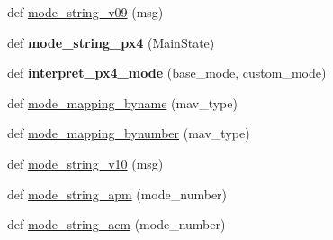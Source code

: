 \begin{DoxyCompactItemize}
\item 
def \hyperlink{namespacepymavlink_1_1mavutil_a783db06982d9f522333a924ab479771b}{mode\+\_\+string\+\_\+v09} (msg)
\item 
\mbox{\label{namespacepymavlink_1_1mavutil_af5358f89a8c0b59e034e262e8955e2c8}} 
def {\bfseries mode\+\_\+string\+\_\+px4} (Main\+State)
\item 
\mbox{\label{namespacepymavlink_1_1mavutil_af62b6a5d02a3c22bf1ee7913d8679939}} 
def {\bfseries interpret\+\_\+px4\+\_\+mode} (base\+\_\+mode, custom\+\_\+mode)
\item 
def \hyperlink{namespacepymavlink_1_1mavutil_adcc2e66e515b28aa81dd57269146f732}{mode\+\_\+mapping\+\_\+byname} (mav\+\_\+type)
\item 
def \hyperlink{namespacepymavlink_1_1mavutil_a5cbe38343057f0223a146df80d3f23a8}{mode\+\_\+mapping\+\_\+bynumber} (mav\+\_\+type)
\item 
def \hyperlink{namespacepymavlink_1_1mavutil_abd1b0e50cf94d71860435e54d37ce462}{mode\+\_\+string\+\_\+v10} (msg)
\item 
def \hyperlink{namespacepymavlink_1_1mavutil_ae82875e1b8c41c234785cfe99012fa3d}{mode\+\_\+string\+\_\+apm} (mode\+\_\+number)
\item 
def \hyperlink{namespacepymavlink_1_1mavutil_a354ee02d2aa8af5107fc1537f58294dc}{mode\+\_\+string\+\_\+acm} (mode\+\_\+number)
\end{DoxyCompactItemize}
